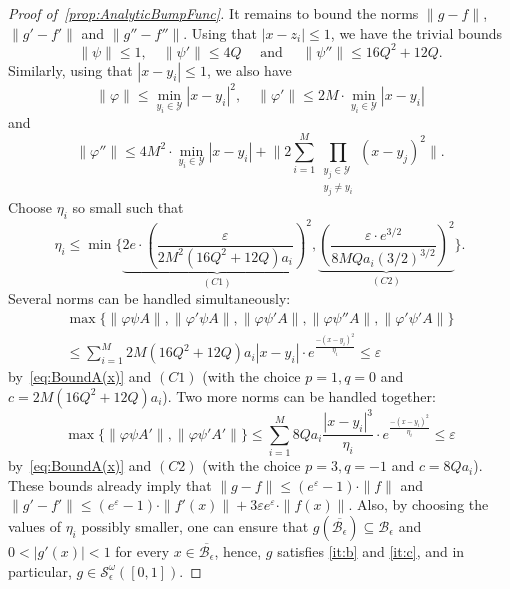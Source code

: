 \documentclass[11pt,]{article}
\def\cref#1{\ref{#1}}%
\theoremstyle{definition}
\theoremstyle{remark}
\newcommand{\0}{\mathbf{0}}
\numberwithin{equation}{section}
\begin{document}
\begin{proof}[Proof of~\cref{prop:AnalyticBumpFunc}]
It remains to bound the norms $\|g-f\|$, $\|g'-f'\|$ and $\|g''-f''\|$. Using that $|x-z_i|\leq 1$,
we have the trivial bounds
\begin{equation*}
\|\psi\| \leq 1, \quad \|\psi'\| \leq 4Q \quad\text{ and }\quad  \|\psi''\| \leq 16Q^2+12Q.
\end{equation*}
Similarly, using that $|x-y_i|\leq 1$, we also have
\begin{equation*}
\|\varphi\| \leq \min_{y_i\in\mathcal{Y}} |x-y_i|^2, \quad \|\varphi'\| \leq
2M\cdot\min_{y_i\in\mathcal{Y}} |x-y_i|  
\end{equation*} 
and
\begin{equation*}
\|\varphi''\| \leq 4M^2\cdot \min_{y_i\in\mathcal{Y}} |x-y_i| + \bigg\|2\sum_{i=1}^{M}
\prod_{\substack{y_j\in\mathcal{Y}\\ y_j\neq y_i}} (x-y_j)^2\bigg\|.
\end{equation*}
Choose $\eta_i$ so small such that
\begin{equation*}
\eta_i \leq \min \bigg\{ \underbrace{2e\cdot \left(\frac{\varepsilon}{2M^2(16Q^2+12Q)a_i}\right)^2
}_{(C1)}, \underbrace{ \left(\frac{\varepsilon\cdot
e^{3/2}}{8MQa_i(3/2)^{3/2}}\right)^2}_{(C2)}\bigg\}.
\end{equation*}
Several norms can be handled simultaneously:
\begin{multline*}
\max\{ \|\varphi \psi A\|,\|\varphi' \psi A\|, \|\varphi \psi' A\|, \|\varphi \psi'' A\|, \|\varphi'
\psi' A\| \} \\
\leq \sum_{i=1}^M 2M(16Q^2+12Q)a_i |x-y_i| \cdot e^{\frac{-(x-y_i)^2}{\eta_i}} \leq \varepsilon
\end{multline*}
by~\cref{eq:BoundA(x)} and $(C1)$ (with the choice $p=1, q=0$ and $c=2M(16Q^2+12Q)a_i$). Two more
norms can be handled together:
\begin{equation*}
\max\{ \|\varphi \psi A'\|, \|\varphi \psi' A'\| \}
	\leq \sum_{i=1}^M 8Qa_i \frac{|x-y_i|^3}{\eta_i} \cdot e^{\frac{-(x-y_i)^2}{\eta_i}} \leq \varepsilon
\end{equation*}
by~\cref{eq:BoundA(x)} and $(C2)$ (with the choice $p=3, q=-1$ and $c=8Qa_i$). These bounds already
imply that $\|g-f\|\leq (e^{\varepsilon}-1)\cdot \|f\|$ and $\|g'-f'\|\leq
(e^{\varepsilon}-1)\cdot\|f'(x)\|+3\varepsilon e^{\varepsilon} \cdot\|f(x)\|$. Also, by choosing the
values of $\eta_i$ possibly smaller, one can ensure that
$g(\overline{\mathcal{B}_\epsilon})\subseteq\mathcal{B}_\epsilon$ and $0<|g'(x)|<1$ for every
$x\in\overline{\mathcal{B}_\epsilon}$, hence, $g$ satisfies \cref{it:b} and \cref{it:c}, and in
particular, $g\in\mathcal{S}_\epsilon^\omega([0,1])$.


\end{proof}
\end{document}
